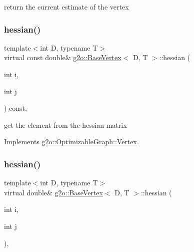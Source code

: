 return the current estimate of the vertex 

\mbox{\label{classg2o_1_1_base_vertex_ac35e0c8c62a59e947ac7710ed85fcd7a}} 
\subsubsection{\texorpdfstring{hessian()}{hessian()}\hspace{0.1cm}{\footnotesize\ttfamily [1/2]}}
{\footnotesize\ttfamily template$<$int D, typename T$>$ \\
virtual const double\& \mbox{\hyperlink{classg2o_1_1_base_vertex}{g2o\+::\+Base\+Vertex}}$<$ D, T $>$\+::hessian (\begin{DoxyParamCaption}\item[{int}]{i,  }\item[{int}]{j }\end{DoxyParamCaption}) const\hspace{0.3cm}{\ttfamily [inline]}, {\ttfamily [virtual]}}



get the element from the hessian matrix 



Implements \mbox{\hyperlink{classg2o_1_1_optimizable_graph_1_1_vertex_af46fa4f0baa4c87e29b137f24e713acb}{g2o\+::\+Optimizable\+Graph\+::\+Vertex}}.

\mbox{\label{classg2o_1_1_base_vertex_a6ab2212fdb00dec460299fdbabe09cb9}} 
\subsubsection{\texorpdfstring{hessian()}{hessian()}\hspace{0.1cm}{\footnotesize\ttfamily [2/2]}}
{\footnotesize\ttfamily template$<$int D, typename T$>$ \\
virtual double\& \mbox{\hyperlink{classg2o_1_1_base_vertex}{g2o\+::\+Base\+Vertex}}$<$ D, T $>$\+::hessian (\begin{DoxyParamCaption}\item[{int}]{i,  }\item[{int}]{j }\end{DoxyParamCaption})\hspace{0.3cm}{\ttfamily [inline]}, {\ttfamily [virtual]}}



